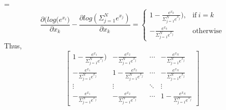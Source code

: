 =
\begin{equation}
    \frac{\partial(log({e^{x_{i}})}}{\partial x_{k}}-\frac{\partial log({\Sigma_{j=1}^{N} e^{x_{j}}})}{\partial x_{k}}=
    \begin{cases}
      1 - \frac{e^{x_{k}}}{\Sigma_{j=1}^{N} e^{x_{j}}}), & \text{if}\ i=k \\
      - \frac{e^{x_{k}}}{\Sigma_{j=1}^{N} e^{x_{j}}} & \text{otherwise}
    \end{cases}
\end{equation}
Thus,
\[
\begin{bmatrix}
1 - \frac{e^{x_{1}}}{\Sigma_{j=1}^{N} e^{x_{j}}})& - \frac{e^{x_{2}}}{\Sigma_{j=1}^{N} e^{x_{j}}}&
\cdots &
- \frac{e^{x_{N}}}{\Sigma_{j=1}^{N} e^{x_{j}}}
\\
 - \frac{e^{x_{1}}}{\Sigma_{j=1}^{N} e^{x_{j}}} &
1 - \frac{e^{x_{2}}}{\Sigma_{j=1}^{N} e^{x_{j}}}&
\cdots &
- \frac{e^{x_{N}}}{\Sigma_{j=1}^{N} e^{x_{j}}}
\\
\vdots & \vdots & \ddots & \vdots
\\
 - \frac{e^{x_{1}}}{\Sigma_{j=1}^{N} e^{x_{j}}} & 
 - \frac{e^{x_{2}}}{\Sigma_{j=1}^{N} e^{x_{j}}}
&
\cdots &
1 - \frac{e^{x_{N}}}{\Sigma_{j=1}^{N} e^{x_{j}}}
\end{bmatrix}
\]